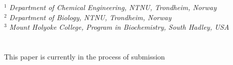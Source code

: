 
\noindent
$^1$ \textit{Department of Chemical Engineering, NTNU, Trondheim, Norway}\\
$^2$ \textit{Department of Biology, NTNU, Trondheim, Norway}\\
$^3$ \textit{Mount Holyoke College, Program in Biochemistry, South Hadley,
USA}\\
\\
\\
This paper is currently in the process of submission
